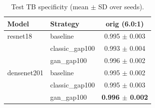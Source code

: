 \begin{table}[htbp]
\centering
\caption{Test TB specificity (mean $\pm$ SD over seeds).}
\label{tab:tb_specificity}
\begin{tabular}{llc}
\toprule
Model & Strategy & orig (6.0:1) \\
\midrule
resnet18 & baseline & 0.995 $\pm$ 0.003 \\
 & classic\_gap100 & 0.993 $\pm$ 0.004 \\
 & gan\_gap100 & 0.996 $\pm$ 0.002 \\
\addlinespace
densenet201 & baseline & 0.995 $\pm$ 0.002 \\
 & classic\_gap100 & 0.995 $\pm$ 0.003 \\
 & gan\_gap100 & \textbf{0.996 $\pm$ 0.002} \\
\bottomrule
\end{tabular}
\end{table}